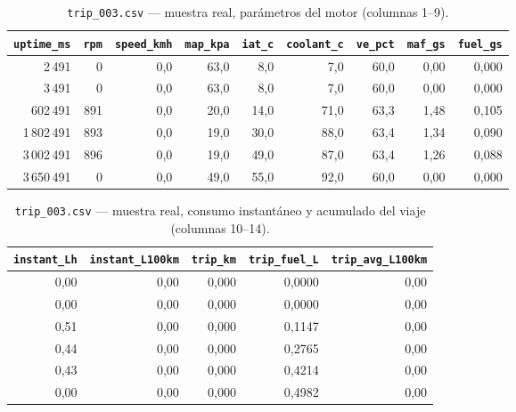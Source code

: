 \begin{table}[H]
	\centering
	\captionsetup{labelformat=simple, labelsep=newline, textfont=it, labelfont=bf, justification=raggedright, singlelinecheck=false}
	\caption{\texttt{trip\_003.csv} — muestra real, parámetros del motor (columnas 1--9).}
	\label{tab:trip_sample_a}
	\scriptsize
	\begin{tabular}{rrrrrrrrr}
		\toprule
		\rowcolor[rgb]{0.851, 0.851, 0.851}
		\texttt{uptime\_ms} & \texttt{rpm} & \texttt{speed\_kmh} & \texttt{map\_kpa} & \texttt{iat\_c} & \texttt{coolant\_c} & \texttt{ve\_pct} & \texttt{maf\_gs} & \texttt{fuel\_gs} \\
		\midrule
		2\,491     & 0   & 0,0 & 63,0 & 8,0  & 7,0  & 60,0 & 0,00 & 0,000 \\
		3\,491     & 0   & 0,0 & 63,0 & 8,0  & 7,0  & 60,0 & 0,00 & 0,000 \\
		602\,491   & 891 & 0,0 & 20,0 & 14,0 & 71,0 & 63,3 & 1,48 & 0,105 \\
		1\,802\,491 & 893 & 0,0 & 19,0 & 30,0 & 88,0 & 63,4 & 1,34 & 0,090 \\
		3\,002\,491 & 896 & 0,0 & 19,0 & 49,0 & 87,0 & 63,4 & 1,26 & 0,088 \\
		3\,650\,491 & 0   & 0,0 & 49,0 & 55,0 & 92,0 & 60,0 & 0,00 & 0,000 \\
		\bottomrule
	\end{tabular}
\end{table}

\begin{table}[H]
	\centering
	\captionsetup{labelformat=simple, labelsep=newline, textfont=it, labelfont=bf, justification=raggedright, singlelinecheck=false}
	\caption{\texttt{trip\_003.csv} — muestra real, consumo instantáneo y acumulado del viaje (columnas 10--14).}
	\label{tab:trip_sample_b}
	\scriptsize
	\begin{tabular}{rrrrr}
		\toprule
		\rowcolor[rgb]{0.851, 0.851, 0.851}
		\texttt{instant\_Lh} & \texttt{instant\_L100km} & \texttt{trip\_km} & \texttt{trip\_fuel\_L} & \texttt{trip\_avg\_L100km} \\
		\midrule
		0,00 & 0,00 & 0,000 & 0,0000 & 0,00 \\
		0,00 & 0,00 & 0,000 & 0,0000 & 0,00 \\
		0,51 & 0,00 & 0,000 & 0,1147 & 0,00 \\
		0,44 & 0,00 & 0,000 & 0,2765 & 0,00 \\
		0,43 & 0,00 & 0,000 & 0,4214 & 0,00 \\
		0,00 & 0,00 & 0,000 & 0,4982 & 0,00 \\
		\bottomrule
	\end{tabular}
\end{table}

